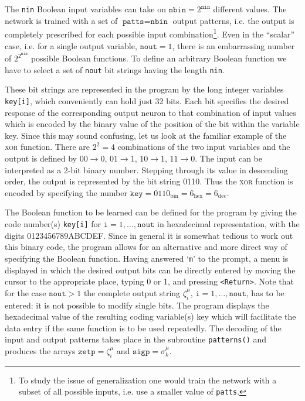 The \texttt{nin} Boolean input variables can take on $\texttt{nbin}=2^{\texttt{nin}}$ different values. The network is trained with a set of $\texttt{patts}=\texttt{nbin}$ output patterns, i.e. the output is completely prescribed for each possible input combination\footnote{To study the issue of generalization one would train the network with a subset of all possible inputs, i.e. use a smaller value of \texttt{patts}.}. Even in the ``scalar'' case, i.e. for a single output variable, $\texttt{nout}=1$, there is an embarrassing number of $2^{2^{\texttt{nin}}}$ possible Boolean functions. To define an arbitrary Boolean function we have to select a set of \texttt{nout} bit strings having the length \texttt{nin}.

These bit strings are represented in the program by the long integer variables \texttt{key[i]}, which conveniently can hold just 32 bits. Each bit specifies the desired response of the corresponding output neuron to that combination of input values which is encoded by the binary value of the position of the bit within the variable key. Since this may sound confusing, let us look at the familiar example of the \textsc{xor} function. There are $2^2=4$ combinations of the two input variables and the output is defined by $00\rightarrow0$, $01\rightarrow1$, $10\rightarrow1$, $11\rightarrow0$. The input can be interpreted as a 2-bit binary number. Stepping through its value in descending order, the output is represented by the bit string 0110. Thus the \textsc{xor} function is encoded by specifying the number $\texttt{key}={0110}_{\text{bin}}={6}_{\text{hex}}={6}_{\text{dec}}$.

The Boolean function to be learned can be defined for the program by giving the code number(s) \texttt{key[i]} for $\texttt{i}=1,\ldots,\texttt{nout}$ in hexadecimal representation, with the digits 0123456789ABCDEF. Since in general it is somewhat tedious to work out this binary code, the program allows for an alternative and more direct way of specifying the Boolean function. Having answered `\texttt{m}' to the prompt, a menu is displayed in which the desired output bits can be directly entered by moving the cursor to the appropriate place, typing 0 or 1, and pressing \texttt{<Return>}. Note that for the case $\texttt{nout}>1$ the complete output string $\zeta_i^\mu$, $\texttt{i}=1,\ldots,\texttt{nout}$, has to be entered: it is not possible to modify single bits. The program displays the hexadecimal value of the resulting coding variable(s) key which will facilitate the data entry if the same function is to be used repeatedly. The decoding of the input and output patterns takes place in the subroutine \texttt{patterns()} and produces the arrays $\texttt{zetp}=\zeta_i^\mu$ and $\texttt{sigp}=\sigma_k^\mu$.

